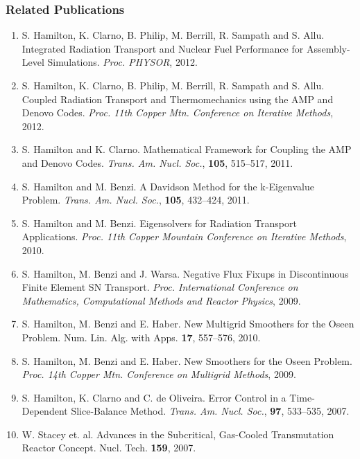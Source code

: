\subsubsection*{Related Publications}
\begin{enumerate}
\parskip = -2pt

\item S. Hamilton, K. Clarno, B. Philip, M. Berrill, R. Sampath and S. Allu.
   Integrated Radiation Transport and Nuclear Fuel Performance for
   Assembly-Level Simulations.  \textit{Proc. PHYSOR}, 2012.

\item S. Hamilton, K. Clarno, B. Philip, M. Berrill, R. Sampath and S. Allu.
   Coupled Radiation Transport and Thermomechanics using the AMP and Denovo
   Codes.  \textit{Proc. 11th Copper Mtn. Conference on Iterative Methods}, 
   2012.

\item S. Hamilton and K. Clarno.  Mathematical Framework for Coupling the AMP 
   and Denovo Codes.  \textit{Trans. Am. Nucl. Soc.}, {\bf 105}, 515--517, 2011.

\item S. Hamilton and M. Benzi.  A Davidson Method for the k-Eigenvalue Problem.
   \textit{Trans. Am. Nucl. Soc.}, {\bf 105}, 432--424, 2011.

\item S. Hamilton and M. Benzi.  Eigensolvers for Radiation Transport
   Applications.  \textit{Proc. 11th Copper Mountain Conference on 
   Iterative Methods}, 2010.

\item S. Hamilton, M. Benzi and J. Warsa.  Negative Flux Fixups in 
   Discontinuous Finite Element SN Transport.  \textit{Proc. International
   Conference on Mathematics, Computational Methods and Reactor Physics},
   2009.

\item S. Hamilton, M. Benzi and E. Haber.  New Multigrid Smoothers for the Oseen 
   Problem. Num. Lin. Alg. with Apps. {\bf 17}, 557--576, 2010.

\item S. Hamilton, M. Benzi and E. Haber.  New Smoothers for the Oseen 
   Problem. \textit{Proc. 14th Copper Mtn. Conference on Multigrid Methods},
   2009.

\item S. Hamilton, K. Clarno and C. de Oliveira.  Error Control in a 
   Time-Dependent Slice-Balance Method.  \textit{Trans. Am. Nucl. Soc.},
   {\bf 97}, 533--535, 2007.

\item W. Stacey et. al.  Advances in the Subcritical,
   Gas-Cooled Transmutation Reactor Concept.  Nucl. Tech. {\bf 159}, 2007.
\end{enumerate}

